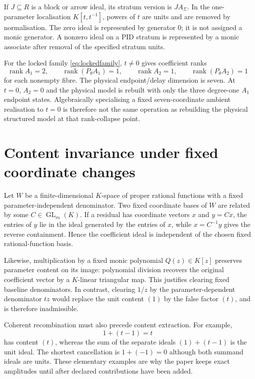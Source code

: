 \documentclass[11pt]{article}
\theoremstyle{definition}
\theoremstyle{remark}
\DeclareMathOperator{\rank}{rank}
\begin{document}
If $J\subseteq R$ is a block or arrow ideal, its stratum version is $JA_\Sigma$. In the one-parameter localisation $K[t,t^{-1}]$, powers of $t$ are units and are removed by normalisation. The zero ideal is represented by generator $0$; it is not assigned a monic generator. A nonzero ideal on a PID stratum is represented by a monic associate after removal of the specified stratum units.

For the locked family \eqref{eq:lockedfamily}, $t\neq0$ gives coefficient ranks
\[
\rank A_1=2,
\qquad
\rank(P_\theta A_1)=1,
\qquad
\rank A_2=1,
\qquad
\rank(P_\theta A_2)=1
\]
for each nonempty fibre. The physical endpoint/delay dimension is seven. At $t=0$, $A_2=0$ and the physical model is rebuilt with only the three degree-one $A_1$ endpoint states. Algebraically specialising a fixed seven-coordinate ambient realisation to $t=0$ is therefore not the same operation as rebuilding the physical structured model at that rank-collapse point.

\section{Content invariance under fixed coordinate changes}\label{app:content}

Let $W$ be a finite-dimensional $K$-space of proper rational functions with a fixed parameter-independent denominator. Two fixed coordinate bases of $W$ are related by some $C\in\operatorname{GL}_m(K)$. If a residual has coordinate vectors $x$ and $y=Cx$, the entries of $y$ lie in the ideal generated by the entries of $x$, while $x=C^{-1}y$ gives the reverse containment. Hence the coefficient ideal is independent of the chosen fixed rational-function basis.

Likewise, multiplication by a fixed monic polynomial $Q(z)\in K[z]$ preserves parameter content on its image: polynomial division recovers the original coefficient vector by a $K$-linear triangular map. This justifies clearing fixed baseline denominators. In contrast, clearing $1/z$ by the parameter-dependent denominator $tz$ would replace the unit content $(1)$ by the false factor $(t)$, and is therefore inadmissible.

Coherent recombination must also precede content extraction. For example,
\[
1+(t-1)=t
\]
has content $(t)$, whereas the sum of the separate ideals $(1)+(t-1)$ is the unit ideal. The shortest cancellation is $1+(-1)=0$ although both summand ideals are units. These elementary examples are why the paper keeps exact amplitudes until after declared contributions have been added.
\end{document}
